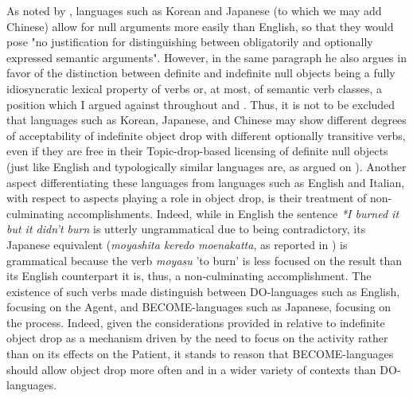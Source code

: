 As noted by \textcite[134]{Jackendoff2003}, languages such as Korean and Japanese (to which we may add Chinese) allow for null arguments more easily than English, so that they would pose "no justiﬁcation for distinguishing between obligatorily and optionally expressed semantic arguments". However, in the same paragraph he also argues in favor of the distinction between definite and indefinite null objects being a fully idiosyncratic lexical property of verbs or, at most, of semantic verb classes, a position which I argued against throughout  and . Thus, it is not to be excluded that languages such as Korean, Japanese, and Chinese may show different degrees of acceptability of indefinite object drop with different optionally transitive verbs, even if they are free in their Topic-drop-based licensing of definite null objects (just like English and typologically similar languages are, as argued on ). Another aspect differentiating these languages from languages such as English and Italian, with respect to aspects playing a role in object drop, is their treatment of non-culminating accomplishments. Indeed, while in English the sentence \textit{*I burned it but it didn't burn} is utterly ungrammatical due to being contradictory, its Japanese equivalent (\textit{moyashita keredo moenakatta}, as reported in \textcite[236]{radden2003metonymic}) is grammatical because the verb \textit{moyasu} 'to burn' is less focused on the result than its English counterpart \textemdash it is, thus, a non-culminating accomplishment. The existence of such verbs made \textcite{ikegami1991language} distinguish between DO-languages such as English, focusing on the Agent, and BECOME-languages such as Japanese, focusing on the process. Indeed, given the considerations provided in  relative to indefinite object drop as a mechanism driven by the need to focus on the activity rather than on its effects on the Patient, it stands to reason that BECOME-languages should allow object drop more often and in a wider variety of contexts than DO-languages.\\
